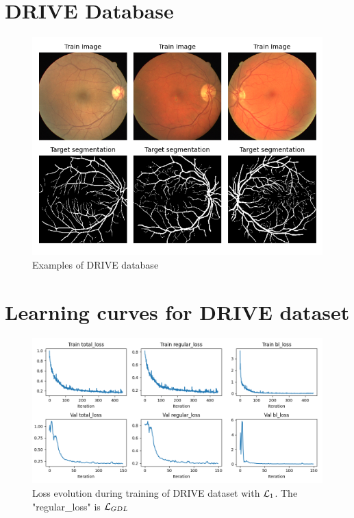 \section{DRIVE Database}

\begin{figure}[h!]
    \centering
    \includegraphics[width=\textwidth]{figures/ex_drive.png}
    \caption{Examples of DRIVE database}
    \label{ex_drive}
\end{figure}
 
\section{Learning curves for DRIVE dataset}

\begin{figure}[H]
    \centering
    \includegraphics[width=\textwidth]{figures/learning_curves.png}
    \caption{Loss evolution during training of DRIVE dataset with $\mathcal{L}_1$. The "regular\_loss" is $\mathcal{L}_{GDL}$}
    \label{fig:learn_curves_drive}
\end{figure}

